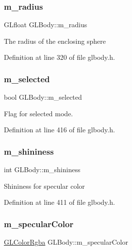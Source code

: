 \subsubsection{\texorpdfstring{m\_radius}{m\_radius}}
{\footnotesize\ttfamily G\+Lfloat G\+L\+Body\+::m\+\_\+radius\hspace{0.3cm}{\ttfamily [protected]}}

The radius of the enclosing sphere 

Definition at line 320 of file glbody.\+h.

\mbox{\label{class_g_l_body_aa98197c0f7376b5afa58302eb96cb05e}} 
\subsubsection{\texorpdfstring{m\_selected}{m\_selected}}
{\footnotesize\ttfamily bool G\+L\+Body\+::m\+\_\+selected\hspace{0.3cm}{\ttfamily [protected]}}

Flag for selected mode. 

Definition at line 416 of file glbody.\+h.

\mbox{\label{class_g_l_body_a4e6949c8876ffe0bc4fddddfa4dd6c9b}} 
\subsubsection{\texorpdfstring{m\_shininess}{m\_shininess}}
{\footnotesize\ttfamily int G\+L\+Body\+::m\+\_\+shininess\hspace{0.3cm}{\ttfamily [protected]}}

Shininess for specular color 

Definition at line 411 of file glbody.\+h.

\mbox{\label{class_g_l_body_ac9db9ed4eb8ca1fbf3e4113c530b92af}} 
\subsubsection{\texorpdfstring{m\_specularColor}{m\_specularColor}}
{\footnotesize\ttfamily \mbox{\hyperlink{class_g_l_color_rgba}{G\+L\+Color\+Rgba}} G\+L\+Body\+::m\+\_\+specular\+Color\hspace{0.3cm}{\ttfamily [protected]}}

